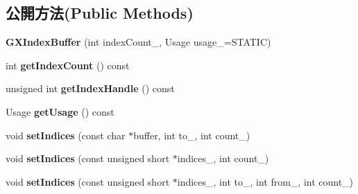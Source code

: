 \subsection*{公開方法(Public Methods)}
\begin{DoxyCompactItemize}
\item 
{\bfseries G\+X\+Index\+Buffer} (int index\+Count\+\_\+, Usage usage\+\_\+=S\+T\+A\+T\+IC)\hypertarget{class_magnum_1_1_g_x_index_buffer_ad8faa9719778a880cab98b15b8ea5f19}{}\label{class_magnum_1_1_g_x_index_buffer_ad8faa9719778a880cab98b15b8ea5f19}

\item 
int {\bfseries get\+Index\+Count} () const \hypertarget{class_magnum_1_1_g_x_index_buffer_a9359412cd1d50ac405f494b59796e008}{}\label{class_magnum_1_1_g_x_index_buffer_a9359412cd1d50ac405f494b59796e008}

\item 
unsigned int {\bfseries get\+Index\+Handle} () const \hypertarget{class_magnum_1_1_g_x_index_buffer_aeb4150ffb39cff083566b8e38b465f20}{}\label{class_magnum_1_1_g_x_index_buffer_aeb4150ffb39cff083566b8e38b465f20}

\item 
Usage {\bfseries get\+Usage} () const \hypertarget{class_magnum_1_1_g_x_index_buffer_aa458ec9bc4fae95d4a1b2d858b6ff12c}{}\label{class_magnum_1_1_g_x_index_buffer_aa458ec9bc4fae95d4a1b2d858b6ff12c}

\item 
void {\bfseries set\+Indices} (const char $\ast$buffer, int to\+\_\+, int count\+\_\+)\hypertarget{class_magnum_1_1_g_x_index_buffer_acdf35d93a65b68f8056644f12d10a5ed}{}\label{class_magnum_1_1_g_x_index_buffer_acdf35d93a65b68f8056644f12d10a5ed}

\item 
void {\bfseries set\+Indices} (const unsigned short $\ast$indices\+\_\+, int count\+\_\+)\hypertarget{class_magnum_1_1_g_x_index_buffer_a3a91a60bc4b89d82cb8b76ed320ae61b}{}\label{class_magnum_1_1_g_x_index_buffer_a3a91a60bc4b89d82cb8b76ed320ae61b}

\item 
void {\bfseries set\+Indices} (const unsigned short $\ast$indices\+\_\+, int to\+\_\+, int from\+\_\+, int count\+\_\+)\hypertarget{class_magnum_1_1_g_x_index_buffer_ad1c0eeea6ae234f910c62a0b5ef45260}{}\label{class_magnum_1_1_g_x_index_buffer_ad1c0eeea6ae234f910c62a0b5ef45260}

\end{DoxyCompactItemize}
